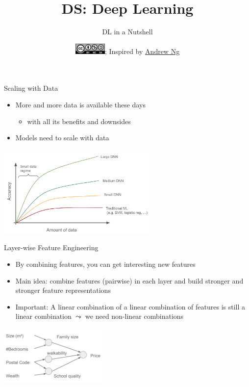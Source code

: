 \documentclass[aspectratio=169]{../latex_main/tntbeamer}  %
\title[DL in a Nutshell]{DS: Deep Learning}
\subtitle{DL in a Nutshell}
\date{\hspace{0.5em} {\includegraphics[height=1.5em]{../latex_main/figures/Cc-by-nc-sa_icon.svg.png}}; Inspired by \href{https://www.deeplearning.ai/resources/}{Andrew Ng}}
\begin{document}
	
	\maketitle
	\begin{frame}{Scaling with Data}

        \begin{itemize}
            \item More and more data is available these days
            \begin{itemize}
                \item with all its benefits and downsides
            \end{itemize}
            \item Models need to scale with data
        \end{itemize}

        \centering
        \includegraphics[width=0.6\textwidth]{figure/dl_scaling}


	\end{frame}

 	\begin{frame}{Layer-wise Feature Engineering}

        \begin{itemize}
            \item By combining features, you can get interesting new features
            \item Main idea: combine features (pairwise) in each layer and build stronger and stronger feature representations
            \item Important: A linear combination of a linear combination of features is still a linear combination $\leadsto$ we need non-linear combinations
        \end{itemize}

        \centering
        \includegraphics[width=0.4\textwidth]{figure/layer_rep}

	\end{frame}
\end{document}
